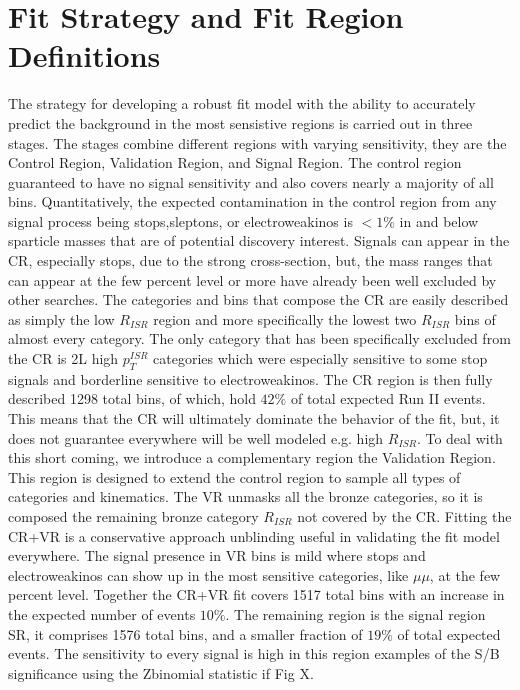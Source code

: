 \section{Fit Strategy and Fit Region Definitions}
The strategy for developing a robust fit model with the ability to accurately predict the background in the most sensistive regions is carried out in three stages. The stages combine different regions with varying sensitivity, they are the Control Region, Validation Region, and Signal Region. The control region guaranteed to have no signal sensitivity and also covers nearly a majority of all bins. Quantitatively, the expected contamination in the control region from any signal process being stops,sleptons, or electroweakinos is $<1\%$ in and below sparticle masses that are of potential discovery interest. Signals can appear in the CR, especially stops, due to the strong cross-section, but, the mass ranges that can appear at the few percent level or more have already been well excluded by other searches. The categories and bins that compose the CR are easily described as simply the low $R_{ISR}$ region and more specifically the lowest two $R_{ISR}$ bins of almost every category. The only category that has been specifically excluded from the CR is 2L high $p_T^{ISR}$ categories which were especially sensitive to some stop signals and borderline sensitive to electroweakinos. The CR region is then fully described 1298 total bins, of which, hold $42\%$ of total expected Run II events. This means that the CR will ultimately dominate the behavior of the fit, but, it does not guarantee everywhere will be well modeled e.g. high $R_{ISR}$. To deal with this short coming, we introduce a complementary region the Validation Region. This region is designed to extend the control region to sample all types of categories and kinematics. The VR unmasks all the bronze categories, so it is composed the remaining bronze category $R_{ISR}$ not covered by the CR. Fitting the CR+VR is a conservative approach unblinding useful in validating the fit model everywhere. The signal presence in VR bins is mild where stops and electroweakinos can show up in the most sensitive categories, like $\mu\mu$, at the few percent level. Together the CR+VR fit covers 1517 total bins with an increase in the expected number of events $10\%$. The remaining region is the signal region SR, it comprises  1576 total bins, and a smaller fraction of $19\%$ of total expected events. The sensitivity to every signal is high in this region examples of the S/B significance using the Zbinomial statistic if Fig X.

